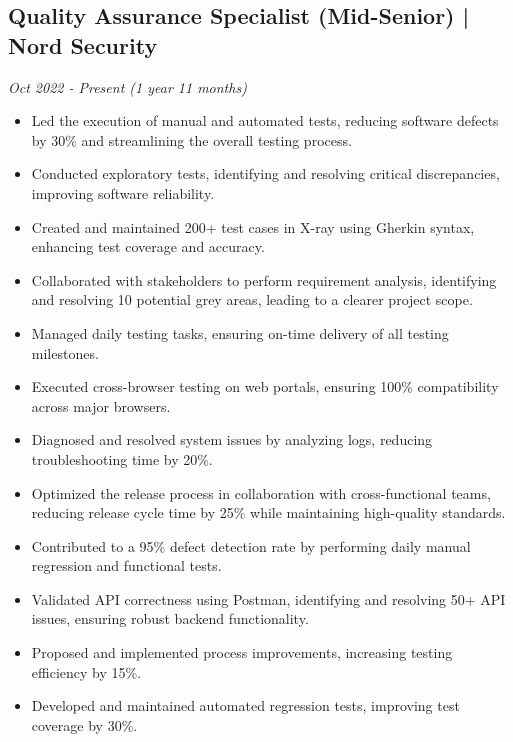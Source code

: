 \documentclass[a4paper,9pt]{article}
\begin{document}
\subsection*{Quality Assurance Specialist (Mid-Senior) | Nord Security}
\textit{Oct 2022 - Present (1 year 11 months)}
\begin{itemize}
    \item Led the execution of manual and automated tests, reducing software defects by 30\% and streamlining the overall testing process.
    \item Conducted exploratory tests, identifying and resolving critical discrepancies, improving software reliability.
    \item Created and maintained 200+ test cases in X-ray using Gherkin syntax, enhancing test coverage and accuracy.
    \item Collaborated with stakeholders to perform requirement analysis, identifying and resolving 10 potential grey areas, leading to a clearer project scope.
    \item Managed daily testing tasks, ensuring on-time delivery of all testing milestones.
    \item Executed cross-browser testing on web portals, ensuring 100\% compatibility across major browsers.
    \item Diagnosed and resolved system issues by analyzing logs, reducing troubleshooting time by 20\%.
    \item Optimized the release process in collaboration with cross-functional teams, reducing release cycle time by 25\% while maintaining high-quality standards.
    \item Contributed to a 95\% defect detection rate by performing daily manual regression and functional tests.
    \item Validated API correctness using Postman, identifying and resolving 50+ API issues, ensuring robust backend functionality.
    \item Proposed and implemented process improvements, increasing testing efficiency by 15\%.
    \item Developed and maintained automated regression tests, improving test coverage by 30\%.
\end{itemize}
\end{document}
